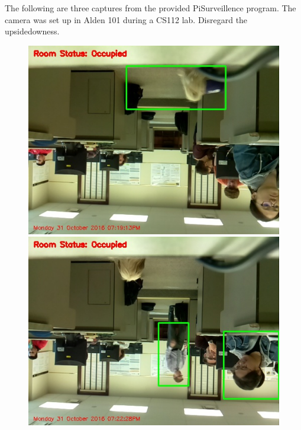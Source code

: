 The following are three captures from the provided PiSurveillence program.  The camera was set up in Alden 101 during a CS112 lab.  Disregard the upsidedowness.

\begin{figure}[h]
  \includegraphics[width=\linewidth]{images/PiSurv1.jpg}
\endminipage\hfill
{}
  \includegraphics[width=\linewidth]{images/PiSurc2.jpg}
\endminipage\hfill
{}%

\end{figure}
